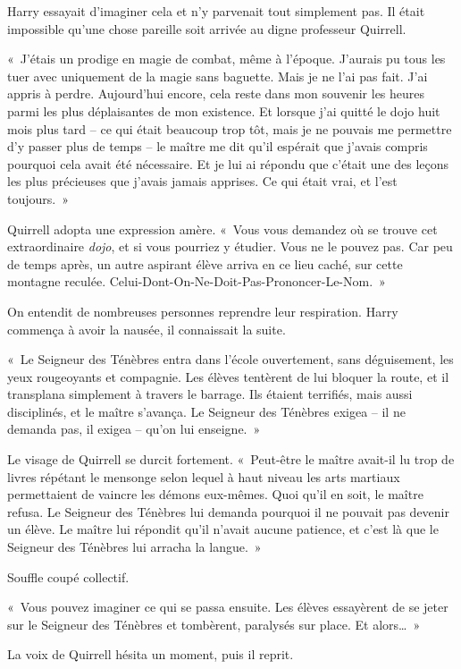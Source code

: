 Harry essayait d'imaginer cela et n'y parvenait tout simplement pas.
Il était impossible qu'une chose pareille soit arrivée au digne professeur Quirrell.

«~J'étais un prodige en magie de combat, même à l'époque.
J'aurais pu tous les tuer avec uniquement de la magie sans baguette.
Mais je ne l'ai pas fait.
J'ai appris à perdre.
Aujourd'hui encore, cela reste dans mon souvenir les heures parmi les plus déplaisantes de mon existence.
Et lorsque j'ai quitté le dojo huit mois plus tard -- ce qui était beaucoup trop tôt, mais je ne pouvais me permettre d'y passer plus de temps -- le maître me dit qu'il espérait que j'avais compris pourquoi cela avait été nécessaire.
Et je lui ai répondu que c'était une des leçons les plus précieuses que j'avais jamais apprises.
Ce qui était vrai, et l'est toujours.~»

Quirrell adopta une expression amère.
«~Vous vous demandez où se trouve cet extraordinaire \emph{dojo}, et si vous pourriez y étudier.
Vous ne le pouvez pas.
Car peu de temps après, un autre aspirant élève arriva en ce lieu caché, sur cette montagne reculée.
Celui-Dont-On-Ne-Doit-Pas-Prononcer-Le-Nom.~»

On entendit de nombreuses personnes reprendre leur respiration.
Harry commença à avoir la nausée, il connaissait la suite.

«~Le Seigneur des Ténèbres entra dans l'école ouvertement, sans déguisement, les yeux rougeoyants et compagnie.
Les élèves tentèrent de lui bloquer la route, et il transplana simplement à travers le barrage.
Ils étaient terrifiés, mais aussi disciplinés, et le maître s'avança.
Le Seigneur des Ténèbres exigea -- il ne demanda pas, il exigea -- qu'on lui enseigne.~»

Le visage de Quirrell se durcit fortement.
«~Peut-être le maître avait-il lu trop de livres répétant le mensonge selon lequel à haut niveau les arts martiaux permettaient de vaincre les démons eux-mêmes.
Quoi qu'il en soit, le maître refusa.
Le Seigneur des Ténèbres lui demanda pourquoi il ne pouvait pas devenir un élève.
Le maître lui répondit qu'il n'avait aucune patience, et c'est là que le Seigneur des Ténèbres lui arracha la langue.~»

Souffle coupé collectif.

«~Vous pouvez imaginer ce qui se passa ensuite.
Les élèves essayèrent de se jeter sur le Seigneur des Ténèbres et tombèrent, paralysés sur place.
Et alors…~»

La voix de Quirrell hésita un moment, puis il reprit.

